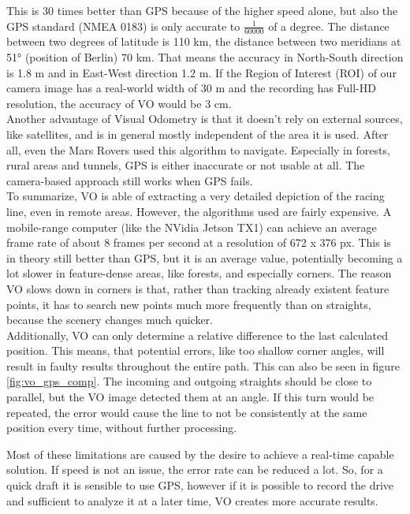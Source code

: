 This is 30 times better than GPS because of the higher speed alone, but also the GPS standard (NMEA 0183) is only accurate to $\frac{1}{60 000}$ of a degree. The distance between two degrees of latitude is 110 km, the distance between two meridians at 51° (position of Berlin) 70 km. That means the accuracy in North-South direction is 1.8 m and in East-West direction 1.2 m. If the Region of Interest (ROI) of our camera image has a real-world width of 30 m and the recording has Full-HD resolution, the accuracy of VO would be 3 cm.\\
Another advantage of Visual Odometry is that it doesn't rely on external sources, like satellites, and is in general mostly independent of the area it is used. After all, even the Mars Rovers \cite{maimone07} used this algorithm to navigate. Especially in forests, rural areas and tunnels, GPS is either inaccurate or not usable at all. The camera-based approach still works when GPS fails.\\
To summarize, VO is able of extracting a very detailed depiction of the racing line, even in remote areas. However, the algorithms used are fairly expensive.
A mobile-range computer (like the NVidia Jetson TX1) can achieve an average frame rate of about 8 frames per second at a resolution of 672 x 376 px. This is in theory still better than GPS, but it is an average value, potentially becoming a lot slower in feature-dense areas, like forests, and especially corners. 
\clearpage
The reason VO slows down in corners is that, rather than tracking already existent feature points, it has to search new points much more frequently than on straights, because the scenery changes much quicker.\\
Additionally, VO can only determine a relative difference to the last calculated position. This means, that potential errors, like too shallow corner angles, will result in faulty results throughout the entire path. This can also be seen in figure \ref{fig:vo_gps_comp}. The incoming and outgoing straights should be close to parallel, but the VO image detected them at an angle. If this turn would be repeated, the error would cause the line to not be consistently at the same position every time, without further processing.

Most of these limitations are caused by the desire to achieve a real-time capable solution. If speed is not an issue, the error rate can be reduced a lot. So, for a quick draft it is sensible to use GPS, however if it is possible to record the drive and sufficient to analyze it at a later time, VO creates more accurate results. 

